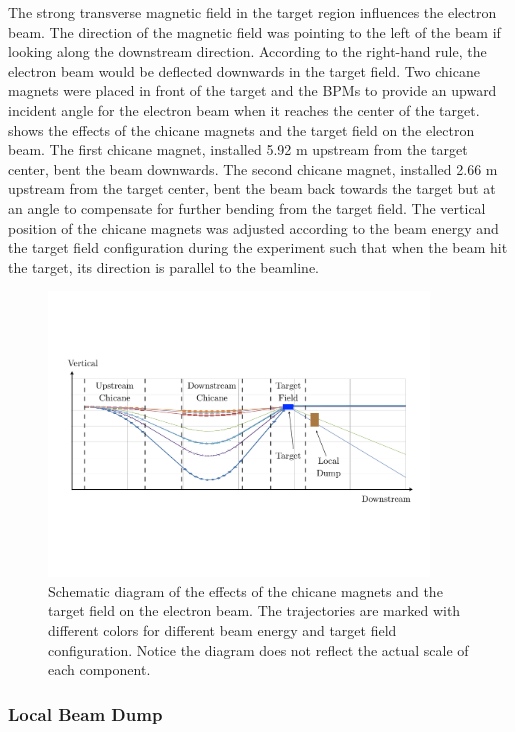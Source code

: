 The strong transverse magnetic field in the target region influences the electron beam. The direction of the magnetic field was pointing to the left of the beam if looking along the downstream direction. According to the right-hand rule, the electron beam would be deflected downwards in the target field. Two chicane magnets were placed in front of the target and the BPMs to provide an upward incident angle for the electron beam when it reaches the center of the target.  shows the effects of the chicane magnets and the target field on the electron beam. The first chicane magnet, installed 5.92 m upstream from the target center, bent the beam downwards. The second chicane magnet, installed 2.66 m upstream from the target center, bent the beam back towards the target but at an angle to compensate for further bending from the target field. The vertical position of the chicane magnets was adjusted according to the beam energy and the target field configuration during the experiment such that when the beam hit the target, its direction is parallel to the beamline.

\begin{figure}[tb!]
  \centering
  \includegraphics[width=0.9\textwidth]{figs/beam-traj.pdf}
  \caption[Schematic diagram of the effects of the chicane magnets.]{Schematic diagram of the effects of the chicane magnets and the target field on the electron beam. The trajectories are marked with different colors for different beam energy and target field configuration. Notice the diagram does not reflect the actual scale of each component. \label{C5S2SS5F3}}
\end{figure}

\subsubsection{Local Beam Dump}

